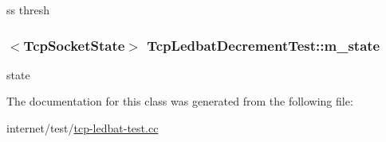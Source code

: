 ss thresh 

\subsubsection[{\texorpdfstring{m\+\_\+state}{m_state}}]{$<${\bf Tcp\+Socket\+State}$>$ Tcp\+Ledbat\+Decrement\+Test\+::m\+\_\+state\hspace{0.3cm}{\ttfamily [private]}}\hypertarget{classTcpLedbatDecrementTest_afd32e873e832600683a6088bd2c9cf70}{}\label{classTcpLedbatDecrementTest_afd32e873e832600683a6088bd2c9cf70}


state 



The documentation for this class was generated from the following file\+:\begin{DoxyCompactItemize}
\item 
internet/test/\hyperlink{tcp-ledbat-test_8cc}{tcp-\/ledbat-\/test.\+cc}\end{DoxyCompactItemize}

